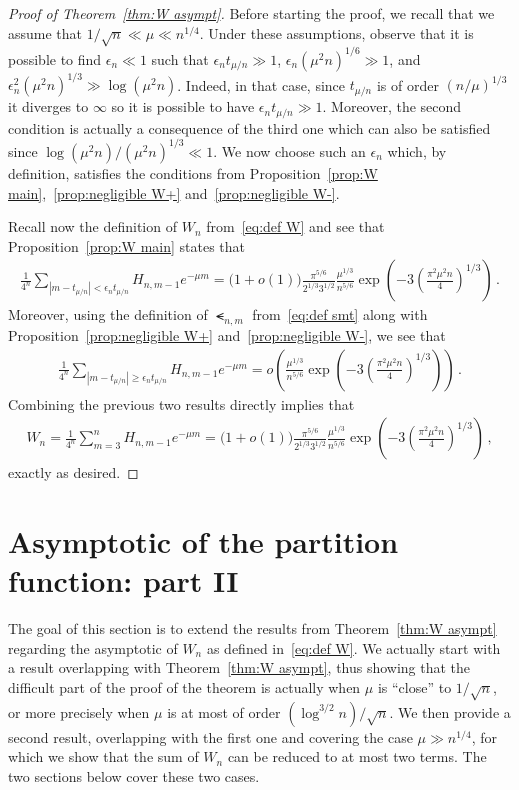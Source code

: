 \documentclass{article}
\newcommand{\1}{\mathbbm{1}}								%
\theoremstyle{definition}
\numberwithin{equation}{section}
\begin{document}
\begin{proof}[Proof of Theorem~\ref{thm:W asympt}]
    Before starting the proof, we recall that we assume that $1/\sqrt{n}\ll\mu\ll n^{1/4}$.
    Under these assumptions, observe that it is possible to find $\epsilon_n\ll1$ such that $\epsilon_nt_{\mu/n}\gg1$, $\epsilon_n(\mu^2n)^{1/6}\gg1$, and $\epsilon_n^2(\mu^2n)^{1/3}\gg\log(\mu^2n)$.
    Indeed, in that case, since $t_{\mu/n}$ is of order $(n/\mu)^{1/3}$ it diverges to $\infty$ so it is possible to have $\epsilon_nt_{\mu/n}\gg1$.
    Moreover, the second condition is actually a consequence of the third one which can also be satisfied since $\log(\mu^2n)/(\mu^2n)^{1/3}\ll1$.
    We now choose such an $\epsilon_n$ which, by definition, satisfies the conditions from Proposition~\ref{prop:W main},~\ref{prop:negligible W+} and~\ref{prop:negligible W-}.

    Recall now the definition of $W_n$ from~\eqref{eq:def W} and see that Proposition~\ref{prop:W main} states that
    \begin{align*}
        \frac{1}{4^n}\sum_{|m-t_{\mu/n}|<\epsilon_nt_{\mu/n}}H_{n,m-1}e^{-\mu m}=\big(1+o(1)\big)\frac{\pi^{5/6}}{2^{1/3}3^{1/2}}\frac{\mu^{1/3}}{n^{5/6}}\exp\left(-3\left(\frac{\pi^2\mu^2n}{4}\right)^{1/3}\right)\,.
    \end{align*}
    Moreover, using the definition of $\smt_{n,m}$ from~\eqref{eq:def smt} along with Proposition~\ref{prop:negligible W+} and~\ref{prop:negligible W-}, we see that
    \begin{align*}
        \frac{1}{4^n}\sum_{|m-t_{\mu/n}|\geq\epsilon_nt_{\mu/n}}H_{n,m-1}e^{-\mu m}=o\left(\frac{\mu^{1/3}}{n^{5/6}}\exp\left(-3\left(\frac{\pi^2\mu^2n}{4}\right)^{1/3}\right)\right)\,.
    \end{align*}
    Combining the previous two results directly implies that
    \begin{align*}
        W_n=\frac{1}{4^n}\sum_{m=3}^nH_{n,m-1}e^{-\mu m}=\big(1+o(1)\big)\frac{\pi^{5/6}}{2^{1/3}3^{1/2}}\frac{\mu^{1/3}}{n^{5/6}}\exp\left(-3\left(\frac{\pi^2\mu^2n}{4}\right)^{1/3}\right)\,,
    \end{align*}
    exactly as desired.
\end{proof}

\section{Asymptotic of the partition function: part II}\label{sec:part fun 2}

The goal of this section is to extend the results from Theorem~\ref{thm:W asympt} regarding the asymptotic of $W_n$ as defined in~\eqref{eq:def W}.
We actually start with a result overlapping with Theorem~\ref{thm:W asympt}, thus showing that the difficult part of the proof of the theorem is actually when $\mu$ is ``close'' to $1/\sqrt{n}$, or more precisely when $\mu$ is at most of order $(\log^{3/2}n)/\sqrt{n}$.
We then provide a second result, overlapping with the first one and covering the case $\mu\gg n^{1/4}$, for which we show that the sum of $W_n$ can be reduced to at most two terms.
The two sections below cover these two cases.
\end{document}
